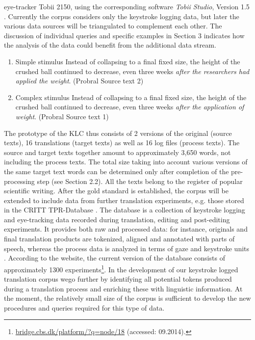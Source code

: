 \documentclass[output=paper]{LSP/langsci}
\begin{document}
eye-tracker Tobii 2150, using the corresponding software \textit{Tobii Studio}, Version 1.5 \citep{Tobii2008}. Currently the corpus considers only the keystroke logging data, but later the various data sources will be triangulated \citep[see][]{Alves2003} to complement each other. The discussion of individual queries and specific examples in Section 3 indicates how the analysis of the data could benefit from the additional data stream. 


\begin{enumerate}[(1)]
\item Simple stimulus \newline
Instead of collapsing to a final fixed size, the height of the crushed ball continued to decrease, even three weeks \textit{after the researchers had applied the weight}. (Probral Source text 2)
\item Complex stimulus \newline
Instead of collapsing to a final fixed size, the height of the crushed ball continued to decrease, even three weeks \textit{after the application of weight}. (Probral Source text 1)
\end{enumerate}

The prototype of the KLC thus consists of 2 versions of the original (source texts), 16 translations (target texts) as well as 16 log files (process texts). The source and target texts together amount to approximately 3,650 words, not including the process texts. The total size taking into account various versions of the same target text words can be determined only after completion of the pre-processing step (see Section 2.2). All the texts belong to the register of popular scientific writing. After the gold standard is established, the corpus will be extended to include data from further translation experiments, e.g. those stored in the CRITT TPR-Database \citep{Carl2012}. The database is a collection of keystroke logging and eye-tracking data recorded during translation, editing and post-editing experiments. It provides both raw and processed data: for instance, originals and final translation products are tokenized, aligned and annotated with parts of speech, whereas the process data is analyzed in terms of gaze and keystroke units \citep{Carl2012}. According to the website, the current version of the database consists of approximately 1300 experiments\footnote{\url{bridge.cbs.dk/platform/?q=node/18} (accessed: 09.2014).}. In the development of our keystroke logged translation corpus wego further by identifying all potential tokens produced during a translation process and enriching these with linguistic information. At the moment, the relatively small size of the corpus is sufficient to develop the new procedures and queries required for this type of data. 
\end{document}
